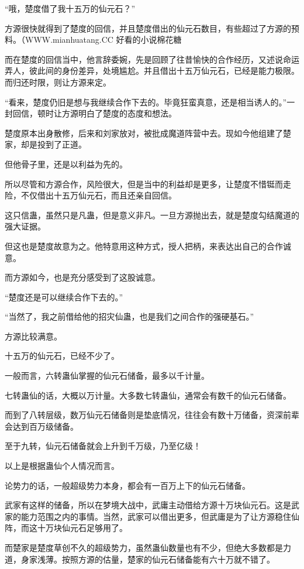 
\begin{this_body}

“哦，楚度借了我十五万的仙元石？”

方源很快就得到了楚度的回信，并且楚度借出的仙元石数目，有些超过了方源的预料。（WWW.mianhuatang.CC 好看的小说棉花糖

而在楚度的回信当中，他言辞委婉，先是回顾了往昔愉快的合作经历，又述说命运弄人，彼此间的身份差异，处境尴尬。并且借出十五万仙元石，已经是能力极限。而归还时限，则让方源来定。

“看来，楚度仍旧是想与我继续合作下去的。毕竟狂蛮真意，还是相当诱人的。”一封回信，顿时让方源明白了楚度的态度和想法。

楚度原本出身散修，后来和刘家放对，被批成魔道阵营中去。现如今他组建了楚家，却是投到了正道。

但他骨子里，还是以利益为先的。

所以尽管和方源合作，风险很大，但是当中的利益却是更多，让楚度不惜铤而走险，不仅借出十五万仙元石，而且还亲自回信。

这只信蛊，虽然只是凡蛊，但是意义非凡。一旦方源抛出去，就是楚度勾结魔道的强大证据。

但这也是楚度故意为之。他特意用这种方式，授人把柄，来表达出自己的合作诚意。

而方源如今，也是充分感受到了这股诚意。

“楚度还是可以继续合作下去的。”

“当然了，我之前借给他的招灾仙蛊，也是我们之间合作的强硬基石。”

方源比较满意。

十五万的仙元石，已经不少了。

一般而言，六转蛊仙掌握的仙元石储备，最多以千计量。

七转蛊仙的话，大概以万计量。大多数七转蛊仙，通常会有数千的仙元石储备。

而到了八转层级，数万仙元石储备则是垫底情况，往往会有数十万储备，资深前辈会达到百万级储备。

至于九转，仙元石储备就会上升到千万级，乃至亿级！

以上是根据蛊仙个人情况而言。

论势力的话，一般超级势力本身，都会有一百万上下的仙元石储备。

武家有这样的储备，所以在梦境大战中，武庸主动借给方源十万块仙元石。这是武家的能力范围之内的事情。当然，武家可以借出更多，但武庸是为了让方源稳住仙阵，而这十万块仙元石足够用了。

而楚家是楚度草创不久的超级势力，虽然蛊仙数量也有不少，但绝大多数都是力道，身家浅薄。按照方源的估量，楚家的仙元石储备能有六十万就不错了。


\end{this_body}
